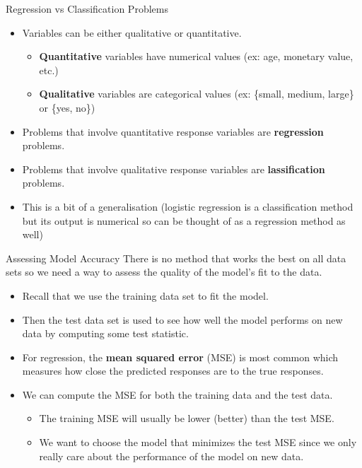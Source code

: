 \documentclass[
  ignorenonframetext,
  aspectratio=169,
]{beamer}
\providecommand{\tightlist}{%
  \setlength{\itemsep}{0pt}\setlength{\parskip}{0pt}}\usepackage{longtable,booktabs,array}
\begin{document}
\begin{frame}{Regression vs Classification Problems}
\protect\hypertarget{regression-vs-classification-problems}{}
\begin{itemize}
\tightlist
\item
  Variables can be either qualitative or quantitative.

  \begin{itemize}
  \tightlist
  \item
    \textbf{Quantitative} variables have numerical values (ex: age,
    monetary value, etc.)
  \item
    \textbf{Qualitative} variables are categorical values (ex: \{small,
    medium, large\} or \{yes, no\})
  \end{itemize}
\item
  \alert{Problems that involve quantitative response variables are \textbf{regression} problems.}
\item
  \alert{Problems that involve qualitative response variables are \textbf{lassification} problems.}
\item
  This is a bit of a generalisation (logistic regression is a
  classification method but its output is numerical so can be thought of
  as a regression method as well)
\end{itemize}
\end{frame}

\begin{frame}{Assessing Model Accuracy}
\protect\hypertarget{assessing-model-accuracy}{}
There is no method that works the best on all data sets so we need a way
to assess the quality of the model's fit to the data.

\begin{itemize}
\tightlist
\item
  Recall that we use the training data set to fit the model.
\item
  Then the test data set is used to see how well the model performs on
  new data by computing some test statistic.
\item
  For regression, the \textbf{mean squared error} (MSE) is most common
  which measures how close the predicted responses are to the true
  responses.
\item
  We can compute the MSE for both the training data and the test data.

  \begin{itemize}
  \tightlist
  \item
    The training MSE will usually be lower (better) than the test MSE.
  \item
    We want to \alert{choose the model that minimizes the test MSE}
    since we only really care about the performance of the model on new
    data.
  \end{itemize}
\end{itemize}
\end{frame}
\end{document}
